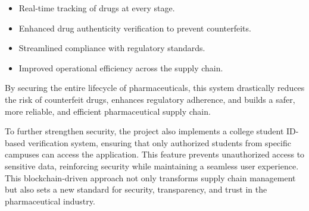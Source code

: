 \documentclass[conference]{IEEEtran}
\begin{document}
\begin{itemize}
    \item Real-time tracking of drugs at every stage.
    \item Enhanced drug authenticity verification to prevent counterfeits.
    \item Streamlined compliance with regulatory standards.
    \item Improved operational efficiency across the supply chain.
\end{itemize}

By securing the entire lifecycle of pharmaceuticals, this system drastically reduces the risk of counterfeit drugs, enhances regulatory adherence, and builds a safer, more reliable, and efficient pharmaceutical supply chain. 

To further strengthen security, the project also implements a college student ID-based verification system, ensuring that only authorized students from specific campuses can access the application. This feature prevents unauthorized access to sensitive data, reinforcing security while maintaining a seamless user experience.
This blockchain-driven approach not only transforms supply chain management but also sets a new standard for security, transparency, and trust in the pharmaceutical industry.
\end{document}
